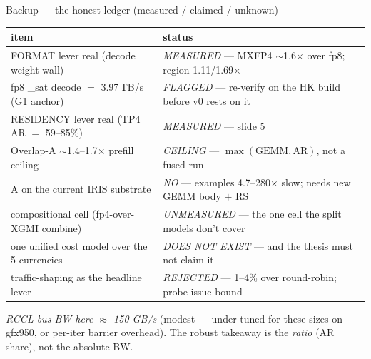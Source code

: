 \documentclass[pdf,aspectratio=169]{beamer}
\newcommand{\empy}[1]{{\color{darkorange}\emph{#1}}}
\newcommand{\empr}[1]{{\color{cardinalred}\emph{#1}}}
\newcommand{\mc}[1]{{\ttfamily\small #1}}
\begin{document}
\begin{frame}{Backup --- the honest ledger (measured / claimed / unknown)}
\footnotesize
\begin{center}
\scriptsize
\begin{tabular}{p{} p{}}
\toprule
item & status \\
\midrule
FORMAT lever real (decode weight wall) & \empy{MEASURED} --- MXFP4 $\sim$1.6$\times$ over fp8; region 1.11/1.69$\times$ \\
fp8 \mc{\_sat} decode $=$ 3.97\,TB/s (G1 anchor) & \empr{FLAGGED} --- re-verify on the HK build before v0 rests on it \\
RESIDENCY lever real (TP4 AR $=$ 59--85\%) & \empy{MEASURED} --- slide 5 \\
Overlap-A $\sim$1.4--1.7$\times$ prefill ceiling & \empr{CEILING} --- $\max(\text{GEMM},\text{AR})$, not a fused run \\
A on the current IRIS substrate & \empr{NO} --- examples 4.7--280$\times$ slow; needs new GEMM body $+$ RS \\
compositional cell (fp4-over-XGMI combine) & \empr{UNMEASURED} --- the one cell the split models don't cover \\
one unified cost model over the 5 currencies & \empr{DOES NOT EXIST} --- and the thesis must not claim it \\
traffic-shaping as the headline lever & \empr{REJECTED} --- 1--4\% over round-robin; probe issue-bound \\
\bottomrule
\end{tabular}
\end{center}
\empr{RCCL bus BW here $\approx$ 150 GB/s} (modest --- under-tuned for these sizes on gfx950, or per-iter barrier overhead). The robust takeaway is the \empy{ratio} (AR share), not the absolute BW.
\end{frame}
\end{document}
